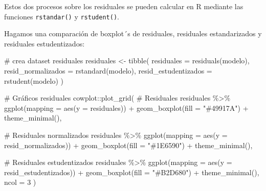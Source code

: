 \documentclass[
  letterpaper,
  DIV=11,
  numbers=noendperiod]{scrartcl}
\newenvironment{Shaded}{\begin{snugshade}}{\end{snugshade}}
\newcommand{\AttributeTok}[1]{\textcolor[rgb]{0.40,0.45,0.13}{#1}}
\newcommand{\CommentTok}[1]{\textcolor[rgb]{0.37,0.37,0.37}{#1}}
\newcommand{\DecValTok}[1]{\textcolor[rgb]{0.68,0.00,0.00}{#1}}
\newcommand{\FunctionTok}[1]{\textcolor[rgb]{0.28,0.35,0.67}{#1}}
\newcommand{\NormalTok}[1]{\textcolor[rgb]{0.00,0.23,0.31}{#1}}
\newcommand{\OtherTok}[1]{\textcolor[rgb]{0.00,0.23,0.31}{#1}}
\newcommand{\SpecialCharTok}[1]{\textcolor[rgb]{0.37,0.37,0.37}{#1}}
\newcommand{\StringTok}[1]{\textcolor[rgb]{0.13,0.47,0.30}{#1}}
\begin{document}
Estos dos procesos sobre los residuales se pueden calcular en R mediante
las funciones \texttt{rstandar()} y \texttt{rstudent()}.

Hagamos una comparación de boxplot´s de residuales, residuales
estandarizados y residuales estudentizados:

\begin{Shaded}
\begin{Highlighting}[]
\CommentTok{\# crea dataset residuales}
\NormalTok{residuales }\OtherTok{\textless{}{-}} \FunctionTok{tibble}\NormalTok{(}
  \AttributeTok{residuales =} \FunctionTok{residuals}\NormalTok{(modelo),}
  \AttributeTok{resid\_normalizados =} \FunctionTok{rstandard}\NormalTok{(modelo),}
  \AttributeTok{resid\_estudentizados =} \FunctionTok{rstudent}\NormalTok{(modelo)}
\NormalTok{)}

\CommentTok{\# Gráficos residuales}
\NormalTok{cowplot}\SpecialCharTok{::}\FunctionTok{plot\_grid}\NormalTok{(}
  \CommentTok{\# Residuales}
\NormalTok{  residuales }\SpecialCharTok{\%\textgreater{}\%} 
    \FunctionTok{ggplot}\NormalTok{(}\AttributeTok{mapping =} \FunctionTok{aes}\NormalTok{(}\AttributeTok{y =}\NormalTok{ residuales)) }\SpecialCharTok{+}
    \FunctionTok{geom\_boxplot}\NormalTok{(}\AttributeTok{fill =} \StringTok{"\#49917A"}\NormalTok{) }\SpecialCharTok{+}
    \FunctionTok{theme\_minimal}\NormalTok{(),}
  
  \CommentTok{\# Residuales normalizados}
\NormalTok{  residuales }\SpecialCharTok{\%\textgreater{}\%} 
    \FunctionTok{ggplot}\NormalTok{(}\AttributeTok{mapping =} \FunctionTok{aes}\NormalTok{(}\AttributeTok{y =}\NormalTok{ resid\_normalizados)) }\SpecialCharTok{+}
    \FunctionTok{geom\_boxplot}\NormalTok{(}\AttributeTok{fill =} \StringTok{"\#1E6590"}\NormalTok{) }\SpecialCharTok{+}
    \FunctionTok{theme\_minimal}\NormalTok{(),}
  
  \CommentTok{\# Residuales estudentizados}
\NormalTok{  residuales }\SpecialCharTok{\%\textgreater{}\%} 
    \FunctionTok{ggplot}\NormalTok{(}\AttributeTok{mapping =} \FunctionTok{aes}\NormalTok{(}\AttributeTok{y =}\NormalTok{ resid\_estudentizados)) }\SpecialCharTok{+}
    \FunctionTok{geom\_boxplot}\NormalTok{(}\AttributeTok{fill =} \StringTok{"\#B2D680"}\NormalTok{) }\SpecialCharTok{+}
    \FunctionTok{theme\_minimal}\NormalTok{(),}
  \AttributeTok{ncol =} \DecValTok{3}
\NormalTok{)}
\end{Highlighting}
\end{Shaded}
\end{document}
